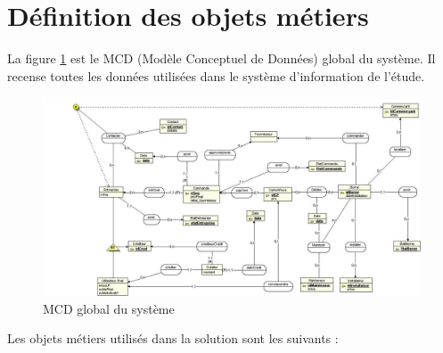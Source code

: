 
\usepackage{rotating}




\section{Définition des objets métiers}

La figure \ref{fig:mcd} est le MCD (Modèle Conceptuel de Données) global du
système. Il recense toutes les données utilisées dans le système d'information
de l'étude.

\begin{landscape}
  \begin{figure}[ht]
      \centering
      \includegraphics[width=0.7\paperheight]{mcd}
      \caption{MCD global du système}
      \label{fig:mcd}
  \end{figure}
\end{landscape}

Les objets métiers utilisés dans la solution sont les suivants : \\

